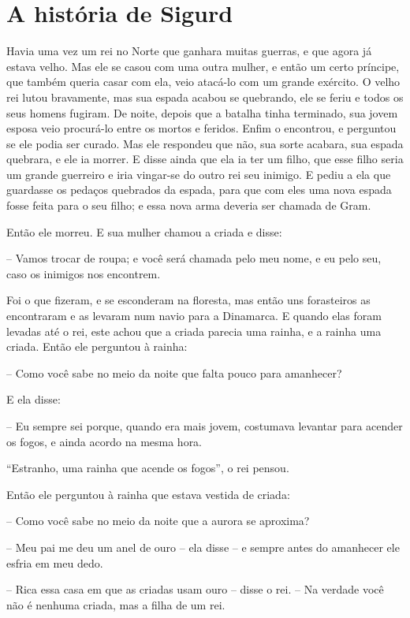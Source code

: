 \chapter{A história de Sigurd}

Havia uma vez um rei no Norte que ganhara muitas guerras, e que agora
já estava velho. Mas ele se casou com uma outra mulher, e então um
certo príncipe, que também queria casar com ela, veio atacá-lo com um
grande exército. O velho rei lutou bravamente, mas sua espada acabou
se quebrando, ele se feriu e todos os seus homens fugiram. De noite,
depois que a batalha tinha terminado, sua jovem esposa veio
procurá-lo entre os mortos e feridos. Enfim o encontrou, e perguntou
se ele podia ser curado. Mas ele respondeu que não, sua sorte
acabara, sua espada quebrara, e ele ia morrer. E disse ainda que ela
ia ter um filho, que esse filho seria um grande guerreiro e iria
vingar-se do outro rei seu inimigo. E pediu a ela que guardasse os
pedaços quebrados da espada, para que com eles uma nova espada fosse
feita para o seu filho; e essa nova arma deveria ser chamada de Gram.


Então ele morreu. E sua mulher chamou a criada e disse:

-- Vamos trocar de roupa; e você será chamada pelo meu nome, e eu pelo
seu, caso os inimigos nos encontrem.

Foi o que fizeram, e se esconderam na floresta, mas então uns
forasteiros as encontraram e as levaram num navio para a Dinamarca. E
quando elas foram levadas até o rei, este achou que a criada parecia
uma rainha, e a rainha uma criada. Então ele perguntou à rainha:

-- Como você sabe no meio da noite que falta pouco para amanhecer? 

E ela disse:

-- Eu sempre sei porque, quando era mais jovem, costumava levantar para
acender os fogos, e ainda acordo na mesma hora.

“Estranho, uma rainha que acende os fogos”, o rei pensou.

Então ele perguntou à rainha que estava vestida de criada:

-- Como você sabe no meio da noite que a aurora se aproxima? 

-- Meu pai me deu um anel de ouro -- ela disse -- e sempre antes do
amanhecer ele esfria em meu dedo.

-- Rica essa casa em que as criadas usam ouro -- disse o rei. -- Na
verdade você não é nenhuma criada, mas a filha de um rei. 

